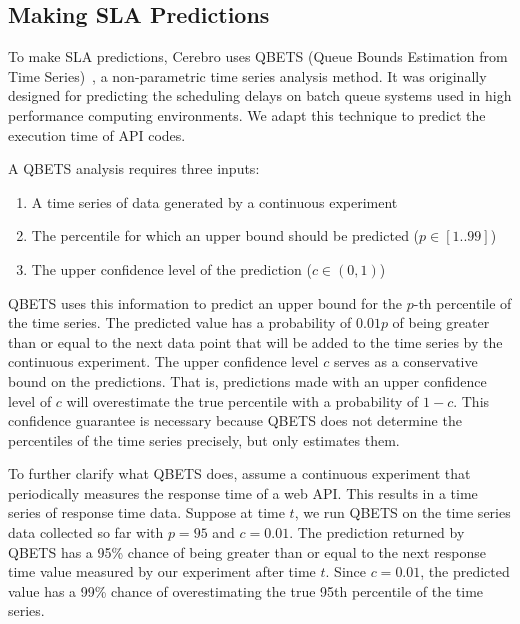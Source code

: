 \subsection{Making SLA Predictions}

To make SLA predictions, Cerebro uses QBETS (Queue Bounds Estimation from Time Series)~\cite{Nurmi:2007:QQB:1791551.1791556},
a non-parametric time series analysis method.
It was originally designed for
predicting the scheduling delays on batch queue systems used in high performance computing environments. 
We adapt this technique to predict the execution time of API codes.

A QBETS analysis requires three inputs:
\begin{enumerate}
\item A time series of data generated by a continuous experiment
\item The percentile for which an upper bound should be predicted ($p \in [1..99]$)
\item The upper confidence level of the prediction ($c \in (0,1)$)
\end{enumerate}

QBETS uses this information to predict an upper bound for the $p$-th percentile of the time series.
The predicted value has a probability of $0.01p$ of being greater than or equal to the next data point that
will be added to the time series by the continuous experiment. 
The upper confidence level $c$ serves as a conservative
bound on the predictions. That is, predictions made with an upper confidence level of $c$ will overestimate
the true percentile with a probability of $1-c$. This confidence guarantee is necessary because 
QBETS does not determine the 
percentiles of the time series precisely, but only estimates them. 

To further clarify what QBETS does, assume a continuous experiment that periodically measures the
response time of a web API. This results in a time series of response time data. Suppose at time $t$,
we run QBETS on the time series data collected so far with $p=95$ and $c=0.01$. The prediction returned
by QBETS has a 95\% chance of being greater than or equal to the next response time value measured
by our experiment after time $t$. Since $c=0.01$, the predicted value has a 99\% chance of
overestimating the true 95th percentile of the time series.


